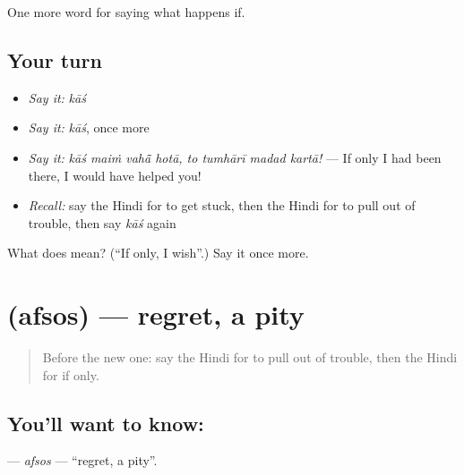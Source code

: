\begin{grammarlens}[title={What you've built}]
One more word for saying what happens if.
\end{grammarlens}

\subsection*{Your turn}
\begin{itemize}
\raggedright
  \item \emph{Say it:} \emph{kāś}
  \item \emph{Say it:} \emph{kāś}, once more
  \item \emph{Say it:} \emph{kāś maiṁ vahā̃ hotā, to tumhārī madad kartā!} — If only I had been there, I would have helped you!
  \item \emph{Recall:} say the Hindi for to get stuck, then the Hindi for to pull out of trouble, then say \emph{kāś} again
\end{itemize}

\begin{tcolorbox}[breakable,colback=teal!4,colframe=teal!35!black,title={Before you move on}]
What does  mean? (\textquotedblleft{}If only, I wish\textquotedblright{}.) Say it once more.
\end{tcolorbox}
\section[\texorpdfstring{\hi{अफ़सोस} (afsos)}{अफ़सोस (afsos)}]{ (afsos) — regret, a pity}

\label{lesson:HI-C381-afsos}



\begin{quote}
Before the new one: say the Hindi for to pull out of trouble, then the Hindi for if only.
\end{quote}

\subsection*{You'll want to know: }
\textbf{} — \emph{afsos} — \textquotedblleft{}regret, a pity\textquotedblright{}.

\begin{quote}
          
\end{quote}

